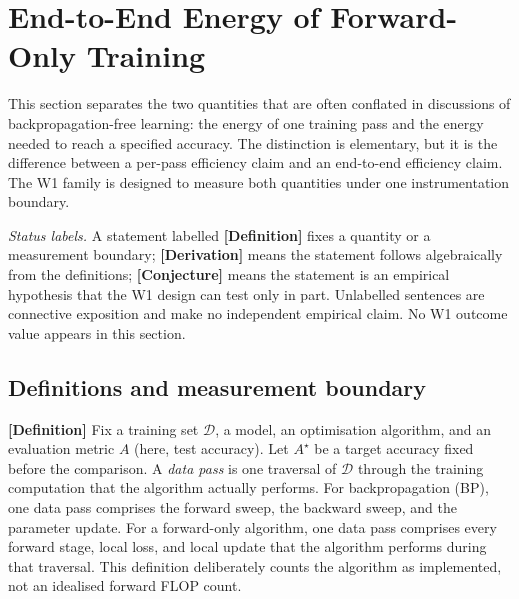 
\section{End-to-End Energy of Forward-Only Training}
\label{sec:theory}

This section separates the two quantities that are often conflated in
discussions of backpropagation-free learning: the energy of one training pass
and the energy needed to reach a specified accuracy.  The distinction is
elementary, but it is the difference between a per-pass efficiency claim and an
end-to-end efficiency claim.  The W1 family is designed to measure both
quantities under one instrumentation boundary.

\noindent\emph{Status labels.}  A statement labelled \textbf{[Definition]}
fixes a quantity or a measurement boundary; \textbf{[Derivation]} means the
statement follows algebraically from the definitions; \textbf{[Conjecture]}
means the statement is an empirical hypothesis that the W1 design can test only
in part.  Unlabelled sentences are connective exposition and make no
independent empirical claim.  No W1 outcome value appears in this section.

\subsection{Definitions and measurement boundary}

\textbf{[Definition]} Fix a training set $\mathcal{D}$, a model, an
optimisation algorithm, and an evaluation metric $A$ (here, test accuracy).
Let $A^\star$ be a target accuracy fixed before the comparison.  A
\emph{data pass} is one traversal of $\mathcal{D}$ through the training
computation that the algorithm actually performs.  For backpropagation (BP),
one data pass comprises the forward sweep, the backward sweep, and the
parameter update.  For a forward-only algorithm, one data pass comprises every
forward stage, local loss, and local update that the algorithm performs during
that traversal.  This definition deliberately counts the algorithm as
implemented, not an idealised forward FLOP count.

